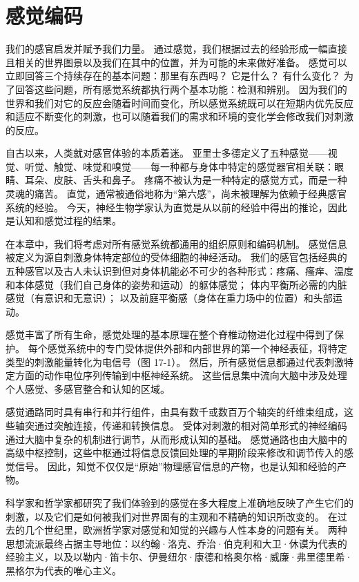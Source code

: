 \chapter{感觉编码}


我们的感官启发并赋予我们力量。 通过感觉，我们根据过去的经验形成一幅直接且相关的世界图景以及我们在其中的位置，并为可能的未来做好准备。 感觉可以立即回答三个持续存在的基本问题：那里有东西吗？ 它是什么？ 有什么变化？ 为了回答这些问题，所有感觉系统都执行两个基本功能：检测和辨别。 因为我们的世界和我们对它的反应会随着时间而变化，所以感觉系统既可以在短期内优先反应和适应不断变化的刺激，也可以随着我们的需求和环境的变化学会修改我们对刺激的反应。

自古以来，人类就对感官体验的本质着迷。 亚里士多德定义了五种感觉——视觉、听觉、触觉、味觉和嗅觉——每一种都与身体中特定的感觉器官相关联：眼睛、耳朵、皮肤、舌头和鼻子。 疼痛不被认为是一种特定的感觉方式，而是一种灵魂的痛苦。 直觉，通常被通俗地称为“第六感”，尚未被理解为依赖于经典感官系统的经验。 今天，神经生物学家认为直觉是从以前的经验中得出的推论，因此是认知和感觉过程的结果。

在本章中，我们将考虑对所有感觉系统都通用的组织原则和编码机制。 感觉信息被定义为源自刺激身体特定部位的受体细胞的神经活动。 我们的感官包括经典的五种感官以及古人未认识到但对身体机能必不可少的各种形式：疼痛、瘙痒、温度和本体感觉（我们自己身体的姿势和运动）的躯体感觉； 体内平衡所必需的内脏感觉（有意识和无意识）； 以及前庭平衡感（身体在重力场中的位置）和头部运动。

感觉丰富了所有生命，感觉处理的基本原理在整个脊椎动物进化过程中得到了保护。 每个感觉系统中的专门受体提供外部和内部世界的第一个神经表征，将特定类型的刺激能量转化为电信号（图 17-1）。 然后，所有感觉信息都通过代表刺激特定方面的动作电位序列传输到中枢神经系统。 这些信息集中流向大脑中涉及处理个人感觉、多感官整合和认知的区域。

感觉通路同时具有串行和并行组件，由具有数千或数百万个轴突的纤维束组成，这些轴突通过突触连接，传递和转换信息。 受体对刺激的相对简单形式的神经编码通过大脑中复杂的机制进行调节，从而形成认知的基础。 感觉通路也由大脑中的高级中枢控制，这些中枢通过将信息反馈回处理的早期阶段来修改和调节传入的感觉信号。 因此，知觉不仅仅是“原始”物理感官信息的产物，也是认知和经验的产物。

科学家和哲学家都研究了我们体验到的感觉在多大程度上准确地反映了产生它们的刺激，以及它们是如何被我们对世界固有的主观和不精确的知识所改变的。 在过去的几个世纪里，欧洲哲学家对感觉和知觉的兴趣与人性本身的问题有关。 两种思想流派最终占据主导地位：以约翰·洛克、乔治·伯克利和大卫·休谟为代表的经验主义，以及以勒内·笛卡尔、伊曼纽尔·康德和格奥尔格·威廉·弗里德里希·黑格尔为代表的唯心主义。


